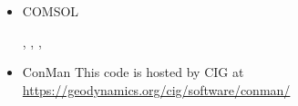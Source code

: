 \begin{itemize}
\item {\codefont COMSOL} 

\begin{scriptsize}
\twothousandeight
\textcite{vack08}
\twothousandtwelve
\textcite{ronb12}
\twothousandfourteen
\textcite{cuwi14}
\textcite{paml14b}
\twothousandfifteen
\textcite{rasg15},
\textcite{khfh15}
\twothousandtwentyone
\textcite{chap21},
\textcite{trbs21},
\textcite{khmo21}
\end{scriptsize}

\item {\codefont ConMan} 
This code is hosted by CIG at \url{https://geodynamics.org/cig/software/conman/}


\end{itemize}
